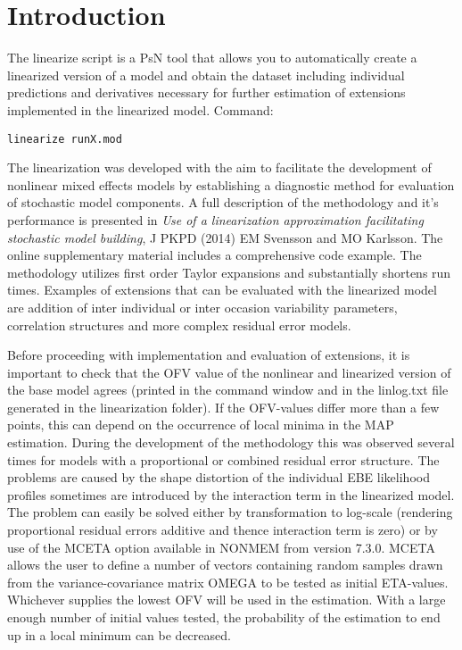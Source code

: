 




\maketitle


\section{Introduction}
The linearize script is a PsN tool that allows you to automatically create a linearized version of a model and obtain the dataset including
individual predictions and derivatives necessary for further estimation of extensions implemented in the linearized model. Command:
\begin{verbatim}
linearize runX.mod
\end{verbatim}

\noindent The linearization was developed with the aim to facilitate the development of nonlinear mixed effects models by establishing a 
diagnostic method for evaluation of stochastic model components. A full description of the methodology and it's performance is presented in
\emph{Use of a linearization approximation facilitating stochastic model building}, J PKPD (2014) EM Svensson and MO Karlsson. The online supplementary 
material includes a comprehensive code example. The methodology utilizes first order Taylor expansions and substantially shortens run times. 
Examples of extensions  that can be evaluated with the linearized model are addition of inter individual or inter occasion variability parameters, 
correlation structures and more complex residual error models. 

Before proceeding with implementation and evaluation of extensions, it is important to check that the OFV value of the nonlinear and linearized 
version of the base model agrees (printed in the command window and in the linlog.txt file generated in the linearization folder). 
If the OFV-values differ more than a few points, this can depend on the occurrence of local minima in the MAP estimation. During the development of the methodology 
this was observed several times for models with a proportional or combined residual error structure. The problems are caused by the shape distortion
of the individual EBE likelihood profiles sometimes are introduced by the interaction term in the linearized model. The problem can easily be solved either by
transformation to log-scale (rendering proportional residual errors additive and thence interaction term is zero) or by use of the MCETA option 
available in NONMEM  from version 7.3.0. MCETA allows the user to define a number of vectors containing random samples drawn from the 
variance-covariance matrix OMEGA to be tested as initial ETA-values. Whichever supplies the lowest OFV will be used in the estimation. With a large 
enough number of initial values tested, the probability of the estimation to end up in a local minimum can be decreased.

